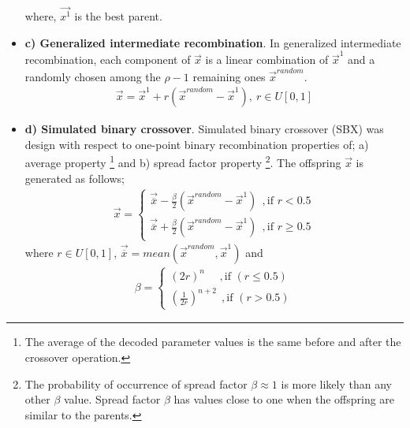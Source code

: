 \begin{itemize}
\begin{figure}[h!]
\begin{minipage}[b]{1.0\linewidth}
 \centering
\end{minipage}
\label{onepX}
\end{figure}
where, $\vec{x^1}$ is the best parent.    
    
\item[]{\bf c) Generalized intermediate recombination}.  In generalized intermediate recombination, each component of $\vec{x}$ is a linear combination of $\vec{x}^1$ and a randomly chosen among the $\rho-1$ remaining ones $\vec{x}^{random}$.
\begin{eqnarray}
\nonumber
\vec{x}=\vec{x}^1+r(\vec{x}^{random}-\vec{x}^1),~ r\in U[0,1]
\end{eqnarray}  
 
\item[]{\bf d) Simulated binary crossover}. Simulated binary crossover (SBX) \cite{SBX1} was design with respect to one-point binary recombination properties of; a) average property \footnote{The average of the decoded parameter values is the same
before and after the crossover operation.} and b) spread factor property \footnote{The probability of occurrence of spread factor $\beta \approx 1$ is more likely than any other $\beta$ value. Spread factor $\beta$ has values close to one when the offspring are similar to the parents.}\cite{SBX1}. The offspring $\vec{x}$ is generated as follows;
\begin{eqnarray}
	\vec{x}={\left\{ 
	\begin{array}{ll}
    \vec{\overline{x}} - \frac{\beta}{2} (\vec{x}^{random}-\vec{x}^1)~~,\mbox{if $r < 0.5$}\\
	\vec{\overline{x}} + \frac{\beta}{2} (\vec{x}^{random}-\vec{x}^1)~~,\mbox{if $r \geq 0.5$}
    \end{array} \right. }
    \label{sbxx}
\end{eqnarray}  
where $r\in U[0,1]$, $\vec{\overline{x}}=mean(\vec{x}^{random},\vec{x}^1)$  and 
\begin{eqnarray}
	\beta={\left\{ 
	\begin{array}{ll}
    (2r)^{n}~~~~~~,\mbox{if $(r \leq 0.5)$}\\
	\left(\frac{1}{2r}\right)^{n+2}~~,\mbox{if $(r > 0.5)$}
    \end{array} \right. }
    \label{betasbx}
\end{eqnarray}


\end{itemize}
